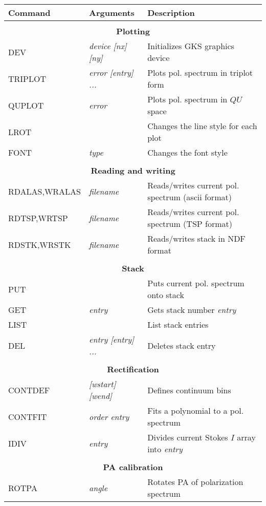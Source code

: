 \begin{center}
\begin{tabular}{lll}
\hline \hline
Command & Arguments & Description \\ \hline \hline \\
\multicolumn{3}{c}{\bf Plotting} \\ \hline
DEV     & {\it device [nx] [ny]} & Initializes GKS graphics device \\
TRIPLOT     & {\it error [entry] ... }& Plots pol. spectrum in triplot form \\
QUPLOT      & {\it error}        & Plots pol. spectrum in $QU$ space \\
LROT        &                    & Changes the line style for each plot \\
FONT        & {\it type}         & Changes the font style \\
\\
\multicolumn{3}{c}{\bf Reading and writing} \\ \hline
RDALAS,WRALAS & {\it filename}   & Reads/writes current pol. spectrum (ascii format) \\
RDTSP,WRTSP & {\it filename}     & Reads/writes current pol. spectrum (TSP format) \\
RDSTK,WRSTK & {\it filename}     & Reads/writes stack in NDF format \\
\\
\multicolumn{3}{c}{\bf Stack} \\ \hline
PUT         &                    & Puts current pol. spectrum onto stack\\
GET         &     {\it entry}    & Gets stack number {\it entry} \\
LIST        &                    & List stack entries            \\
DEL         & {\it entry [entry] ...}  & Deletes stack entry           \\
\\
\multicolumn{3}{c}{\bf Rectification} \\ \hline
CONTDEF     & {\it [wstart] [wend]} & Defines continuum bins  \\
CONTFIT     & {\it order entry}   & Fits a polynomial to a pol. spectrum \\
IDIV        & {\it entry}         & Divides current Stokes $I$ array into {\it entry} \\
\\
\multicolumn{3}{c}{\bf PA calibration} \\ \hline
ROTPA       & {\it angle}         & Rotates PA of polarization spectrum \\

\end{tabular}
\end{center}
